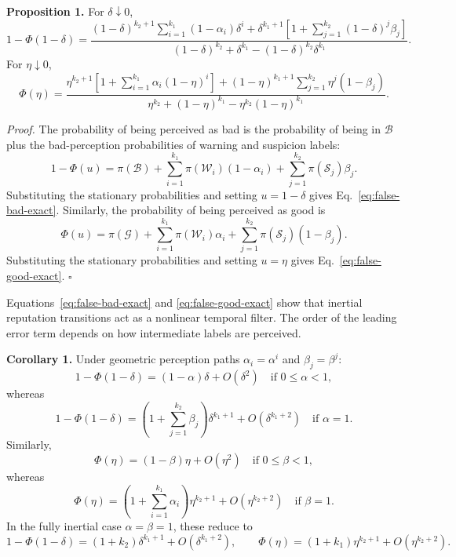 \documentclass[fleqn,10pt]{wlscirep}
\begin{document}
\textbf{Proposition 1.}
For $\delta\downarrow 0$,
\begin{equation}
\label{eq:false-bad-exact}
1-\Phi(1-\delta)=
\frac{
(1-\delta)^{k_2+1}\sum_{i=1}^{k_1}(1-\alpha_i)\delta^i
+\delta^{k_1+1}\left[1+\sum_{j=1}^{k_2}(1-\delta)^j\beta_j\right]
}{
(1-\delta)^{k_2}+\delta^{k_1}-(1-\delta)^{k_2}\delta^{k_1}
}.
\end{equation}
For $\eta\downarrow 0$,
\begin{equation}
\label{eq:false-good-exact}
\Phi(\eta)=
\frac{
\eta^{k_2+1}\left[1+\sum_{i=1}^{k_1}\alpha_i(1-\eta)^i\right]
+(1-\eta)^{k_1+1}\sum_{j=1}^{k_2}\eta^j(1-\beta_j)
}{
\eta^{k_2}+(1-\eta)^{k_1}-\eta^{k_2}(1-\eta)^{k_1}
}.
\end{equation}

\textit{Proof.}
The probability of being perceived as bad is the probability of being in $\mathcal{B}$ plus the bad-perception probabilities of warning and suspicion labels:
\[
1-\Phi(u)=\pi(\mathcal{B})+\sum_{i=1}^{k_1}\pi(\mathcal{W}_i)(1-\alpha_i)+\sum_{j=1}^{k_2}\pi(\mathcal{S}_j)\beta_j.
\]
Substituting the stationary probabilities and setting $u=1-\delta$ gives Eq.~\eqref{eq:false-bad-exact}. Similarly, the probability of being perceived as good is
\[
\Phi(u)=\pi(\mathcal{G})+\sum_{i=1}^{k_1}\pi(\mathcal{W}_i)\alpha_i+\sum_{j=1}^{k_2}\pi(\mathcal{S}_j)(1-\beta_j).
\]
Substituting the stationary probabilities and setting $u=\eta$ gives Eq.~\eqref{eq:false-good-exact}. \hfill$\square$

Equations~\eqref{eq:false-bad-exact} and \eqref{eq:false-good-exact} show that inertial reputation transitions act as a nonlinear temporal filter. The order of the leading error term depends on how intermediate labels are perceived.

\textbf{Corollary 1.}
Under geometric perception paths $\alpha_i=\alpha^i$ and $\beta_j=\beta^j$:
\[
1-\Phi(1-\delta)=(1-\alpha)\delta+O(\delta^2)
\quad\text{if }0\le\alpha<1,
\]
whereas
\begin{equation}
\label{eq:false-bad-high-order}
1-\Phi(1-\delta)=\left(1+\sum_{j=1}^{k_2}\beta_j\right)\delta^{k_1+1}+O(\delta^{k_1+2})
\quad\text{if }\alpha=1.
\end{equation}
Similarly,
\[
\Phi(\eta)=(1-\beta)\eta+O(\eta^2)
\quad\text{if }0\le\beta<1,
\]
whereas
\begin{equation}
\label{eq:false-good-high-order}
\Phi(\eta)=\left(1+\sum_{i=1}^{k_1}\alpha_i\right)\eta^{k_2+1}+O(\eta^{k_2+2})
\quad\text{if }\beta=1.
\end{equation}
In the fully inertial case $\alpha=\beta=1$, these reduce to
\begin{equation}
\label{eq:fully-inertial-filtering}
1-\Phi(1-\delta)=(1+k_2)\delta^{k_1+1}+O(\delta^{k_1+2}),\qquad
\Phi(\eta)=(1+k_1)\eta^{k_2+1}+O(\eta^{k_2+2}).
\end{equation}
\end{document}
